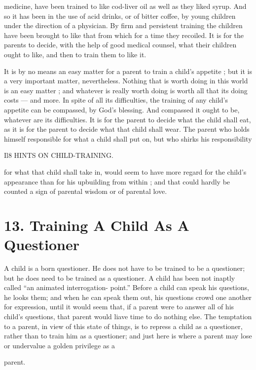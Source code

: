 \documentclass[
]{book}
\begin{document}
medicine, have been trained to like cod-liver oil as well as they liked syrup. And so it has been in the use of acid drinks, or of bitter coffee, by young children under the direction of a physician. By firm and persistent training the children have been brought to like that from which for a time they recoiled. It is for the parents to decide, with the help of good medical counsel, what their children ought to like, and then to train them to like it.

It is by no means an easy matter for a parent to train a child's appetite ; but it is a very important matter, nevertheless. Nothing that is worth doing in this world is an easy matter ; and whatever is really worth doing is worth all that its doing costs --- and more. In spite of all its difficulties, the training of any child's appetite can be compassed, by God's blessing. And compassed it ought to be, whatever are its difficulties. It is for the parent to decide what the child shall eat, as it is for the parent to decide what that child shall wear. The parent who holds himself responsible for what a child shall put on, but who shirks his responsibility

Il8 HINTS ON CHILD-TRAINING.

for what that child shall take in, would seem to have more regard for the child's appearance than for his upbuilding from within ; and that could hardly be counted a sign of parental wisdom or of parental love.

\hypertarget{training-a-child-as-a-questioner}{%
\chapter{13. Training A Child As A Questioner}\label{training-a-child-as-a-questioner}}

A child is a born questioner. He does not have to be trained to be a questioner; but he does need to be trained as a questioner. A child has been not inaptly called ``an animated interrogation- point.'' Before a child can speak his questions, he looks them; and when he can speak them out, his questions crowd one another for expression, until it would seem that, if a parent were to answer all of his child's questions, that parent would liave time to do nothing else. The temptation to a parent, in view of this state of things, is to repress a child as a questioner, rather than to train him as a questioner; and just here is where a parent may lose or undervalue a golden privilege as a

parent.
\end{document}
